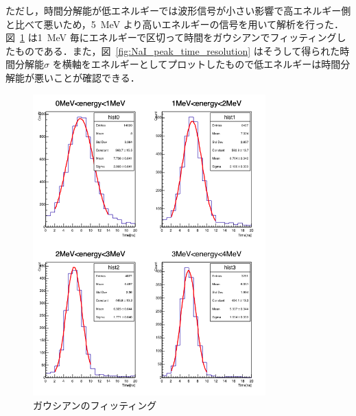 ただし，時間分解能が低エネルギーでは波形信号が小さい影響で高エネルギー側と比べて悪いため，5~MeV より高いエネルギーの信号を用いて解析を行った．図~\ref{fig:NaI_peak_gaus_fitting} は1~MeV 毎にエネルギーで区切って時間をガウシアンでフィッティングしたものである．また，図~\ref{fig:NaI_peak_time_resolution} はそうして得られた時間分解能$\sigma$ を横軸をエネルギーとしてプロットしたもので低エネルギーは時間分解能が悪いことが確認できる．

\begin{figure}[H]%
\begin{minipage}{0.5\hsize}
\centering
\includegraphics[width  = 0.8\textwidth]{figure/mino/gausfitting_ratio.png}
\caption{ガウシアンのフィッティング}
\label{fig:NaI_peak_gaus_fitting}
\end{minipage}
\begin{minipage}{0.5\hsize}
\centering

\end{minipage}
\end{figure}
